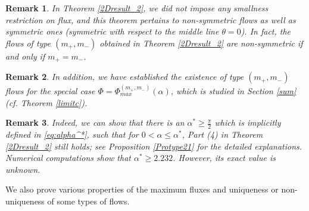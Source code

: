 \documentclass[reqno,12pt]{amsart}
\newtheorem{remark}{Remark}[section]
\begin{document}
\begin{remark}
In Theorem \ref{2Dresult_2}, we did not impose any smallness restriction on flux, and this theorem pertains to non-symmetric flows as well as symmetric ones (symmetric with respect to the middle line $\theta=0$). In fact, the flows of type $(m_+, m_-)$ obtained in Theorem \ref{2Dresult_2}  are non-symmetric if and only if $m_+ =m_-$.
\end{remark}
\begin{remark}
In addition, we have established the existence of type $(m_{+}, m_{-})$ flows for the special case $\Phi=\Phi^{(m_+,m_-)}_{max}(\alpha)$, which  is studied in Section \ref{sum} (cf. Theorem \ref{limitc}).
\end{remark}
 {
\begin{remark}
 Indeed, we can show that there is an
 $\alpha^*\geq\frac{\pi}{2}$ which is implicitly defined in \eqref{eq:alpha^*}, such that
for $0<\alpha\leq \alpha^*$, Part (4) in Theorem \ref{2Dresult_2} still holds; see Proposition \ref{Protype21} for the detailed explanations.
  Numerical computations show that $\alpha^*\geq 2.232$. However, its exact value is unknown.
\end{remark}
}
We also prove various properties of the maximum fluxes and uniqueness or non-uniqueness of some types of flows.  
\end{document}
